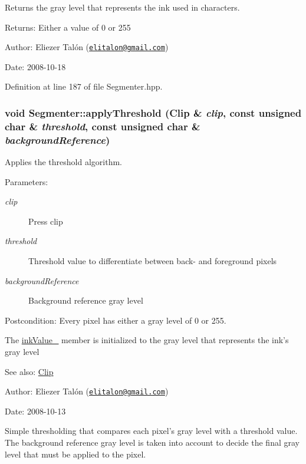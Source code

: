 Returns the gray level that represents the ink used in characters. 

\begin{Desc}
\item[Returns:]Either a value of 0 or 255\end{Desc}
\begin{Desc}
\item[Author:]Eliezer Talón (\href{mailto:elitalon@gmail.com}{\tt elitalon@gmail.com}) \end{Desc}
\begin{Desc}
\item[Date:]2008-10-18 \end{Desc}


Definition at line 187 of file Segmenter.hpp.\hypertarget{class_segmenter_6854315e3320f9d9a8ece14cbb8570ee}{
\subsubsection[applyThreshold]{\setlength{\rightskip}{0pt plus 5cm}void Segmenter::applyThreshold ({\bf Clip} \& {\em clip}, \/  const unsigned char \& {\em threshold}, \/  const unsigned char \& {\em backgroundReference})}}
\label{class_segmenter_6854315e3320f9d9a8ece14cbb8570ee}


Applies the threshold algorithm. 

\begin{Desc}
\item[Parameters:]
\begin{description}
\item[{\em clip}]Press clip \item[{\em threshold}]Threshold value to differentiate between back- and foreground pixels \item[{\em backgroundReference}]Background reference gray level\end{description}
\end{Desc}
\begin{Desc}
\item[Postcondition:]Every pixel has either a gray level of 0 or 255. 

The \hyperlink{class_segmenter_fa6183f99aa6011399783652b341a43b}{inkValue\_\-} member is initialized to the gray level that represents the ink's gray level\end{Desc}
\begin{Desc}
\item[See also:]\hyperlink{class_clip}{Clip}\end{Desc}
\begin{Desc}
\item[Author:]Eliezer Talón (\href{mailto:elitalon@gmail.com}{\tt elitalon@gmail.com}) \end{Desc}
\begin{Desc}
\item[Date:]2008-10-13\end{Desc}
Simple thresholding that compares each pixel's gray level with a threshold value. The background reference gray level is taken into account to decide the final gray level that must be applied to the pixel. 

